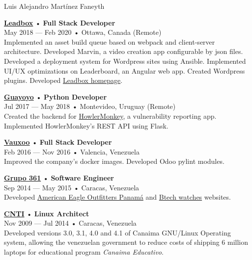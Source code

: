 \documentclass[12pt]{article}
\begin{document}
\begin{cv}{Luis Alejandro Mart\'inez Faneyth}
\begin{minipage}[t]{0.55\textwidth}
{    }\vspace{0.125em}
    \parbox[t]{\linewidth}{
      \textbf{\href{http://leadboxhq.com}{Leadbox}} • \textrm{\textbf{Full Stack Developer}}\\
      May 2018 --- Feb 2020 • Ottawa, Canada (Remote)\\
      \footnotesize{Implemented an asset build queue based on webpack and client-server architecture. Developed Marvin, a video creation app configurable by json files. Developed a deployment system for Wordpress sites using Ansible. Implemented UI/UX optimizations on Leaderboard, an Angular web app. Created Wordpress plugins. Developed \href{https://leadboxhq.com}{Leadbox homepage}.}\\
    }\vspace{0.125em}
    \parbox[t]{\linewidth}{
      \textbf{\href{https://guayoyo.io}{Guayoyo}} • \textrm{\textbf{Python Developer}}\\
      Jul 2017 --- May 2018 • Montevideo, Uruguay (Remote)\\
      \footnotesize{Created the backend for \href{https://howlermonkey.io}{HowlerMonkey}, a vulnerability reporting app. Implemented HowlerMonkey's REST API using Flask.}\\
    }\vspace{0.125em}
    \parbox[t]{\linewidth}{
      \textbf{\href{https://www.vauxoo.com}{Vauxoo}} • \textrm{\textbf{Full Stack Developer}}\\
      Feb 2016 --- Nov 2016 • Valencia, Venezuela\\
      \footnotesize{Improved the company's docker images. Developed Odoo pylint modules.}\\
    }\vspace{0.125em}
    \parbox[t]{\linewidth}{
      \textbf{\href{https://web.archive.org/web/20180322024522/http://grupo361.com/}{Grupo 361}} • \textrm{\textbf{Software Engineer}}\\
      Sep 2014 --- May 2015 • Caracas, Venezuela\\
      \footnotesize{Developed \href{https://web.archive.org/web/20180322024522/http://grupo361.com/}{American Eagle Outfitters Panamá} and \href{https://web.archive.org/web/20180322024522/http://grupo361.com/}{Btech watches} websites.}\\
    }\vspace{0.125em}
    \parbox[t]{\linewidth}{
      \textbf{\href{https://www.cnti.gob.ve}{CNTI}} • \textrm{\textbf{Linux Architect}}\\
      Nov 2009 --- Jul 2014 • Caracas, Venezuela\\
      \footnotesize{Developed versions 3.0, 3.1, 4.0 and 4.1 of Canaima GNU/Linux Operating system, allowing the venezuelan government to reduce costs of shipping 6 million laptops for educational program \textsl{Canaima Educativo}.}\\
    }
  \end{minipage}

\end{cv}
\end{document}
